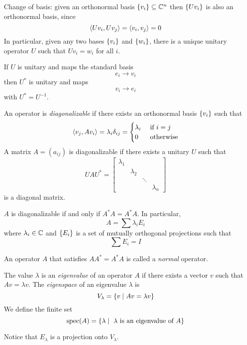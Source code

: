 \begin{enumerate}[label=\arabic*.]
          Change of basis: given an orthonormal basis $\left\lbrace v_i\right\rbrace \subseteq \mathbb{C}^n$
          then $\left\lbrace Uv_i\right\rbrace$ is also an orthonormal basis, since
          \[\left\langle Uv_i, Uv_j\right\rangle = \left\langle v_i, v_j\right\rangle = 0\]
          In particular, given any two bases $\left\lbrace v_i\right\rbrace$ and $\left\lbrace w_i\right\rbrace$, there is a unique
          unitary operator $U$ such that $Uv_i = w_i$ for all $i$.

          If $U$ is unitary and maps the standard basis
          \[e_i \to v_i\]
          then $U^*$ is unitary and maps
          \[v_i \to e_i\]
          with $U^* = U^{-1}$.

          \begin{definition}
              An operator is \emph{diagonalizable} if there exists an orthonormal basis
              $\left\lbrace v_i\right\rbrace$ such that
              \[\left\langle v_j, Av_i\right\rangle = \lambda_i\delta_{ij} = \begin{cases}\lambda_i &\hbox{ if $i=j$}\\0&\hbox{ otherwise}\end{cases}\]
              A matrix $A = (a_{ij})$ is diagonalizable if there exists a unitary $U$
              such that
              \[UAU^* = \begin{bmatrix}\lambda_1\\&\lambda_2\\&&\ddots\\&&&\lambda_n\end{bmatrix}\]
              is a diagonal matrix.
          \end{definition}
\end{enumerate}

\begin{theorem}
    $A$ is diagonalizable if and only if $A^*A = A^*A$. In particular,
    \[A = \sum \lambda_i E_i\]
    where $\lambda_i \in \mathbb{C}$ and $\left\lbrace E_i\right\rbrace$ is a set of mutually orthogonal
    projections such that
    \[\sum E_i = I\]
\end{theorem}

An operator $A$ that satisfies $AA^* = A^*A$ is called a \emph{normal} operator.

\begin{definition}[Eigenvalue]
    The value $\lambda$ is an \emph{eigenvalue} of an operator $A$ if there exists
    a vector $v$ such that $Av = \lambda v$. The \emph{eigenspace} of an eigenvalue
    $\lambda$ is
    \[V_{\lambda} = \left\lbrace v \mid Av = \lambda v\right\rbrace\]
    We define the finite set
    \[\operatorname{spec}(A) = \left\lbrace\lambda \mid \hbox{ $\lambda$ is an eigenvalue of $A$}\right\rbrace\]
\end{definition}
Notice that $E_{\lambda}$ is a projection onto $V_{\lambda}$.

